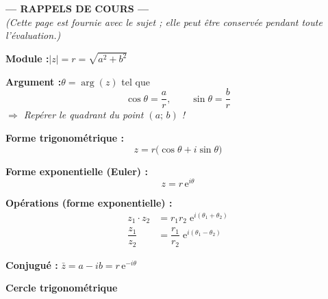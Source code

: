 \documentclass[a4paper,11pt]{article}
\newcommand{\ee}{\mathrm{e}}
\begin{document}
\newpage

\thispagestyle{fancy}

\begin{center}
  {\LARGE\bfseries\textcolor{uimm-blue}{--- RAPPELS DE COURS ---}}\\[4pt]
  {\small\itshape (Cette page est fournie avec le sujet ; elle peut être
   conservée pendant toute l'évaluation.)}
\end{center}

\vspace{0.3cm}

\begin{tcolorbox}[
  colback=rappel-bg, colframe=orange-dark,
  boxrule=1pt, arc=4pt,
  title={\bfseries\textcolor{white}{%
    Formes d'un nombre complexe $z = a + ib$ \quad et \quad
    Cercle trigonométrique}},
  attach boxed title to top left={yshift=-2mm, xshift=4mm},
  boxed title style={colback=orange-dark, arc=2pt}]

\begin{minipage}[t]{0.46\linewidth}

\textbf{Module :}\quad $|z| = r = \sqrt{a^2+b^2}$

\medskip
\textbf{Argument :}\quad $\theta = \arg(z)$ tel que
\[
  \cos\theta = \dfrac{a}{r},\qquad \sin\theta = \dfrac{b}{r}
\]
\textit{\small $\Rightarrow$ Repérer le quadrant du point $(a;\,b)$ !}

\medskip
\textbf{Forme trigonométrique :}
\[z = r\bigl(\cos\theta + i\sin\theta\bigr)\]

\textbf{Forme exponentielle (Euler) :}
\[z = r\,\ee^{i\theta}\]

\medskip
\textbf{Opérations (forme exponentielle) :}
\begin{align*}
z_1 \cdot z_2 &= r_1 r_2\;\ee^{i(\theta_1+\theta_2)}\\[4pt]
\dfrac{z_1}{z_2} &= \dfrac{r_1}{r_2}\;\ee^{i(\theta_1-\theta_2)}
\end{align*}

\medskip
\small\textbf{Conjugué :}\quad
$\bar{z} = a - ib = r\,\ee^{-i\theta}$
\end{minipage}%
\hfill%
\begin{minipage}[t]{0.51\linewidth}
\centering
\textbf{Cercle trigonométrique}

\vspace{4pt}


\end{minipage}
\end{tcolorbox}
\end{document}
